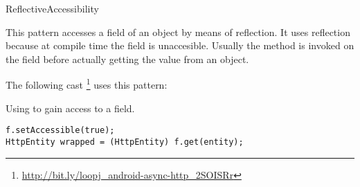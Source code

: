 
\begin{pattern}{ReflectiveAccessibility}

This pattern accesses a field of an object by means of reflection.
It uses reflection because at compile time the field is unaccesible.
Usually the method  is invoked on the field
before actually getting the value from an object.

\instances{}
The following cast%
\footnote{\url{http://bit.ly/loopj_android-async-http_2SOISRr}}
uses this pattern:

\begin{listing}
\caption{Using  to gain access to a field.}
\begin{verbatim}
f.setAccessible(true);
HttpEntity wrapped = (HttpEntity) f.get(entity);
\end{verbatim}
\end{listing}

\end{pattern}
